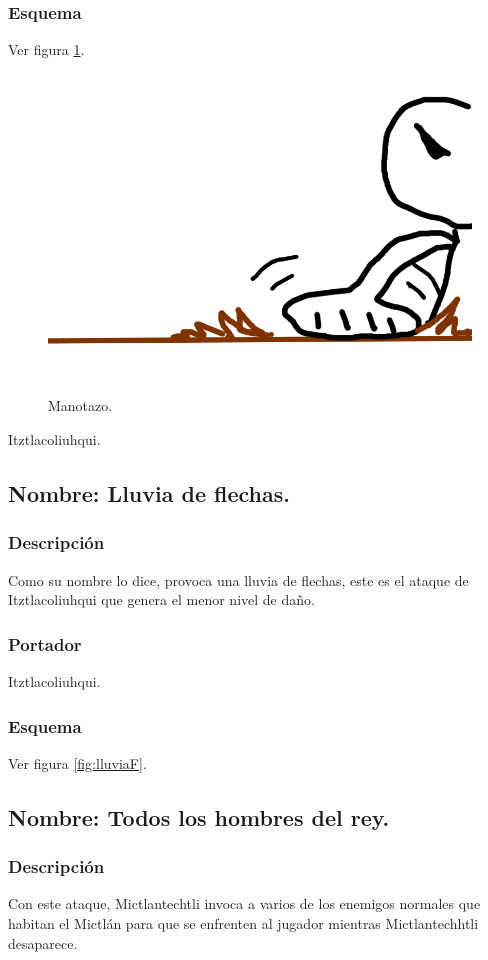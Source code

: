 \documentclass[11pt,letterpaper]{article}
\begin{document}
\subsubsection{Esquema}
			Ver figura \ref{fig:manotazo}.
			\begin{figure}
				\centering
				\includegraphics[height=0.2 \textheight]{Imagenes/manotazo}
				\caption{Manotazo.}
				\label{fig:manotazo}
			\end{figure}
Itztlacoliuhqui.
\subsection{Nombre: Lluvia de flechas.}
\subsubsection{Descripción}
Como su nombre lo dice, provoca una lluvia de flechas, este es el ataque de Itztlacoliuhqui que genera el menor nivel de daño. 
\subsubsection{Portador}
Itztlacoliuhqui.
\subsubsection{Esquema}
			Ver figura \ref{fig:lluviaF}.
\subsection{Nombre: Todos los hombres del rey.}
\subsubsection{Descripción}
Con este ataque,  Mictlantechtli invoca a varios de los enemigos normales que habitan el Mictlán para que se enfrenten al jugador mientras  Mictlantechhtli desaparece.
\end{document}
